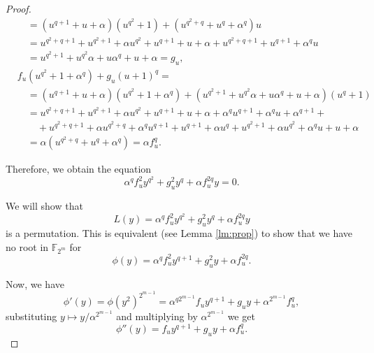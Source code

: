 \documentclass{article}
\begin{document}
\begin{proof}
\begin{align*}
    &\quad=(u^{q+1}+u+\alpha)(u^{q^2}+1)+(u^{q^2+q}+u^q+\alpha^q)u\\
    &\quad=u^{q^2+q+1}+u^{q^2+1}+\alpha u^{q^2}+u^{q+1}+u+\alpha+ u^{q^2+q+1}+u^{q+1}+\alpha^qu\\
    &\quad= u^{q^2+1}+u^{q^2}\alpha+u\alpha^q+u+\alpha= g_u,\\
    & f_u(u^{q^2}+1+\alpha^q)+g_u(u+1)^q=\\
     &\quad= (u^{q+1}+u+\alpha)(u^{q^2}+1+\alpha^q)+(u^{q^2+1}+u^{q^2}\alpha+u\alpha^q+u+\alpha)(u^q+1)\\
     &\quad= u^{q^2+q+1}+u^{q^2+1}+\alpha u^{q^2}+u^{q+1}+u+\alpha+\alpha^qu^{q+1}+\alpha^qu+\alpha^{q+1}+\\
     &\quad\quad+u^{q^2+q+1}+\alpha u^{q^2+q}+\alpha^qu^{q+1}+u^{q+1}+\alpha u^q+u^{q^2+1}+\alpha u^{q^2}+\alpha^qu+u+\alpha\\
     &\quad= \alpha(u^{q^2+q}+u^q+\alpha^q)=
     \alpha f_u^q.
\end{align*}

    
Therefore, we obtain  the  equation
\begin{equation}\label{eq:a}
        \alpha^qf_u^2y^{q^2}+g_u^2y^q+\alpha f_u^{2q}y=0.
\end{equation}

 We will show that 
$$
L(y)=\alpha^qf_u^2y^{q^2}+g_u^2y^q+\alpha f_u^{2q}y
$$
is a permutation. This is equivalent (see Lemma \ref{lm:prop}) to show that we have no root in $\mathbb{F}_{2^m}$ for 
$$
\phi(y)=\alpha^qf_u^2y^{q+1}+g_u^2y+\alpha f_u^{2q}.
$$

Now, we have
$$
\phi'(y)=\phi(y^2)^{2^{m-1}}=\alpha^{q2^{m-1}}f_uy^{q+1}+g_uy+\alpha^{2^{m-1}} f_u^{q},
$$
substituting $y\mapsto y/\alpha^{2^{m-1}}$ and multiplying by $\alpha^{2^{m-1}}$ we get
$$
\phi''(y)=f_uy^{q+1}+g_uy+\alpha f_u^{q}.
$$


\end{proof}
\end{document}
